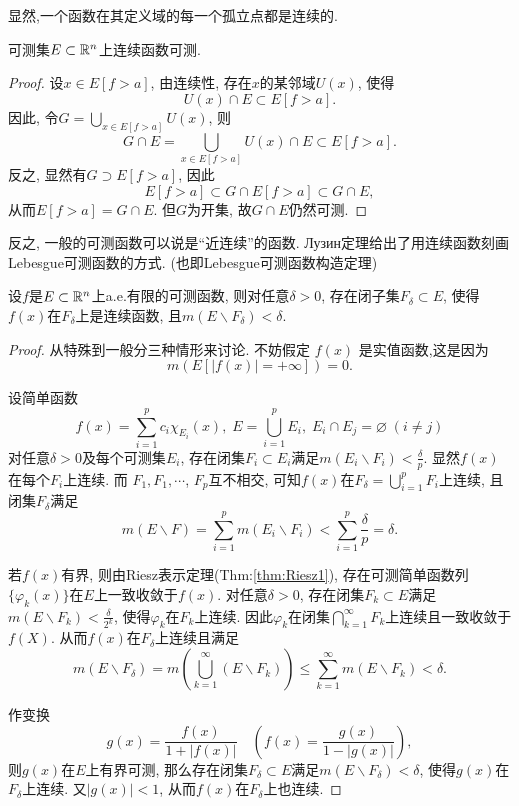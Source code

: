 显然,一个函数在其定义域的每一个孤立点都是连续的.
\begin{theorem}[连续函数可测]
	可测集$E \subset \mathbb{R}^n$上连续函数可测. 
\end{theorem}
\begin{proof}
	设$x \in E[f>a]$, 由连续性, 存在$x$的某邻域$U(x)$, 使得
	$$
		U(x) \cap E \subset E[f>a].
	$$
	因此, 令$G = \bigcup\limits_{x \in E[f>a]} U(x)$, 则
	$$
		G \cap E = \bigcup\limits_{x \in E[f>a]} U(x) \cap E \subset E[f>a].
	$$
	反之, 显然有$G \supset E[f>a]$, 因此
	$$
		E[f>a] \subset G \cap E[f>a] \subset G \cap E,
	$$
	从而$E[f>a] = G \cap E$. 但$G$为开集, 故$G \cap E$仍然可测. 
\end{proof}

反之, 一般的可测函数可以说是“近连续”的函数. Лузин定理给出了用连续函数刻画Lebesgue可测函数的方式. (也即Lebesgue可测函数构造定理)

\begin{theorem}[Лузин定理] \label{thm:Lusin1}
	设$f$是$E \subset \mathbb{R}^n$上a.e.有限的可测函数, 则对任意$\delta > 0$, 
	存在闭子集$F_{\delta} \subset E$, 使得$f(x)$在$F_{\delta}$上是连续函数, 
	且$m(E\backslash F_{\delta}) < \delta$.
\end{theorem}
\begin{proof}
	从特殊到一般分三种情形来讨论. 不妨假定 $f(x)$ 是实值函数,这是因为
	$$
		m \left( E[|f(x)|=+\infty] \right)=0.
	$$
	
	\par
	设简单函数
	$$
		f(x) = \sum\limits_{i=1}^p c_i \chi_{E_i}(x),\; 
		E = \bigcup\limits_{i=1}^p E_i,\;
		E_i \cap E_j = \varnothing\;(i \neq j)
	$$
	对任意$\delta > 0$及每个可测集$E_i$, 存在闭集$F_i \subset E_i$满足$m( E_i \backslash F_i) < \frac{\delta}p$. 
	显然$f(x)$在每个$F_i$上连续. 
	而 $F_1, F_1, \cdots$, $F_p$互不相交, 可知$f(x)$在$F_{\delta} = \bigcup\limits_{i=1}^p F_i$上连续, 且闭集$F_\delta$满足
	$$
		m(E \backslash F)
		=\sum\limits_{i=1}^p m\left(E_i \backslash F_i\right)
		<\sum\limits_{i=1}^p \frac{\delta}p=\delta .
	$$
	
	\par
	若$f(x)$有界, 则由Riesz表示定理(Thm:\ref{thm:Riesz1}), 存在可测简单函数列$\{ \varphi_k(x) \}$在$E$上一致收敛于$f(x)$. 
	对任意$\delta > 0$, 存在闭集$F_k \subset E$满足$m(E \backslash F_k) < \frac{\delta}{2^k}$, 使得$\varphi_k$在$F_k$上连续.
	因此$\varphi_k$在闭集$\bigcap\limits_{k=1}^{\infty} F_k$上连续且一致收敛于$f(X)$. %
	从而$f(x)$在$F_{\delta}$上连续且满足
	$$
		m(E \backslash F_{\delta}) 
		= m \left( \bigcup\limits_{k=1}^{\infty} (E \backslash F_k) \right)
		\leq \sum\limits_{k=1}^{\infty} m(E \backslash F_k) < \delta .
	$$
	
	\par
	作变换
	$$
	g(x)=\frac{f(x)}{1+|f(x)|} \quad\left(f(x)=\frac{g(x)}{1-|g(x)|}\right),
	$$
	则$g(x)$在$E$上有界可测, 那么存在闭集$F_{\delta} \subset E$满足$m(E \backslash F_{\delta}) < \delta$, 使得$g(x)$在$F_{\delta}$上连续. 
	又$|g(x)| < 1$, 从而$f(x)$在$F_{\delta}$上也连续.
	
\end{proof}


